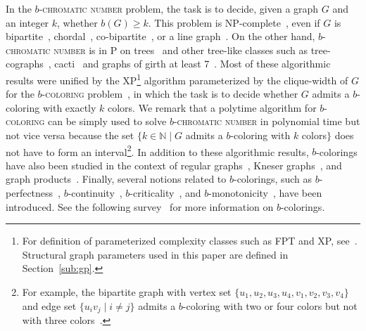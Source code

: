 \documentclass[runningheads, envcountsame]{llncs}
\newcommand{\sep}{\;|\;}
\newcommand{\FPT}{\textsf{FPT}\xspace}
\newcommand{\NP}{\textsf{NP}\xspace}
\newcommand{\XP}{\textsf{XP}\xspace}
\newcommand{\bcoloring}{$b$-\textsc{coloring}\xspace}
\newcommand{\bchromatic}{\textsc{$b$-chromatic number}\xspace}
\begin{document}
In the \bchromatic problem, the task is to decide, given a graph $G$ and an integer $k$, whether $b(G) \ge k$.
This problem is \NP-complete~\cite{IRVING1999127}, even if $G$ is bipartite~\cite{KratochvilTV02}, chordal~\cite{HavetSS12}, co-bipartite~\cite{BonomoSSV15}, or a line graph~\cite{CamposLMSSS15}.
On the other hand, \bchromatic is in \textsf{P} on trees~\cite{IRVING1999127} and other tree-like classes such as tree-cographs~\cite{BonomoSSV15}, cacti~\cite{CamposSMS09} and graphs of girth at least 7~\cite{CamposLS15}.
Most of these algorithmic results were unified by the \XP\footnote{For definition of parameterized complexity classes such as \FPT and \XP, see~\cite{flum2006parameterized}. Structural graph parameters used in this paper are defined in Section~\ref{sub:gp}.} algorithm parameterized by the clique-width of $G$ for the \bcoloring problem~\cite{JaffkeLL24}, in which the task is to decide whether $G$ admits a $b$-coloring with exactly $k$ colors.
We remark that a polytime algorithm for \bcoloring can be simply used to solve \bchromatic in polynomial time but not vice versa because the set $\{k \in \mathbb N \sep G$ admits a $b$-coloring with $k$ colors$\}$ does not have to form an interval\footnote{For example, the bipartite graph with vertex set $\{u_1, u_2, u_3, u_4, v_1, v_2, v_3, v_4\}$ and edge set $\{u_iv_j \sep i \ne j\}$ admits a $b$-coloring with two or four colors but not with three colors~\cite{IRVING1999127}.}.
In addition to these algorithmic results, $b$-colorings have also been studied in the context of regular graphs~\cite{KratochvilTV02,CabelloJ11,SahiliKM15,jakovac2010b,shaebani2012b,el2014b}, Kneser graphs~\cite{javadi2009b,hajiabolhassan2010b,balakrishnan2012b,shaebani2019note}, and graph products~\cite{kouider2007b,balakrishnan2014b,maffray2013b,jakovac2012b}.
Finally, several notions related to $b$-colorings, such as $b$-perfectness~\cite{hoang2005b}, $b$-continuity~\cite{barth2007b}, $b$-criticality~\cite{ikhlef2010characterization}, and $b$-monotonicity~\cite{bonomo2009b}, have been introduced.
See the following survey~\cite{jakovac2018b} for more information on $b$-colorings.
\end{document}

